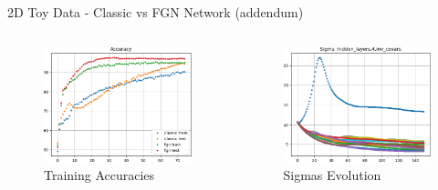 \documentclass{beamer}
\begin{document}
\begin{frame}{2D Toy Data - Classic vs FGN Network (addendum)}
\begin{columns}
    \begin{column}{.333\textwidth}
    \begin{figure}
        \centering
        \includegraphics[width=1.\textwidth]{images/2D-network-toy/training-accuracy.png}
        \caption*{Training Accuracies}
    \end{figure}
    \end{column}
    
    \begin{column}{.333\textwidth}
    \begin{figure}
        \centering
        \includegraphics[width=1.\textwidth]{images/2D-network-toy/sigmas-change.png}
        \caption*{Sigmas Evolution}
    \end{figure}
    \end{column}
    \end{columns}
    
\end{frame}
\end{document}

